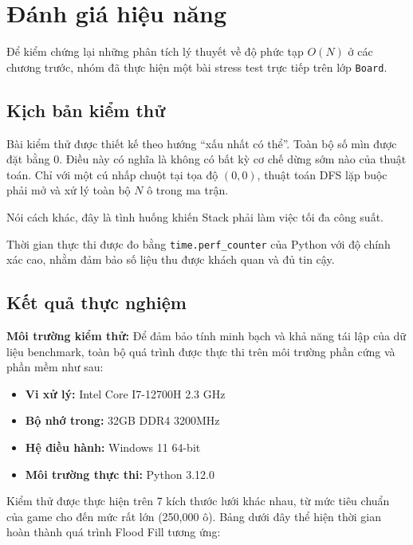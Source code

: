 \section{Đánh giá hiệu năng}

Để kiểm chứng lại những phân tích lý thuyết về độ phức tạp $O(N)$ ở các chương trước, nhóm đã thực hiện một bài stress test trực tiếp trên lớp \texttt{Board}.

\subsection{Kịch bản kiểm thử }

Bài kiểm thử được thiết kế theo hướng “xấu nhất có thể”. Toàn bộ số mìn được đặt bằng $0$. Điều này có nghĩa là không có bất kỳ cơ chế dừng sớm nào của thuật toán. Chỉ với một cú nhấp chuột tại tọa độ $(0,0)$, thuật toán DFS lặp buộc phải mở và xử lý toàn bộ $N$ ô trong ma trận.

Nói cách khác, đây là tình huống khiến Stack phải làm việc tối đa công suất.

Thời gian thực thi được đo bằng \texttt{time.perf\_counter} của Python với độ chính xác cao, nhằm đảm bảo số liệu thu được khách quan và đủ tin cậy.

\subsection{Kết quả thực nghiệm}

\textbf{Môi trường kiểm thử:}
Để đảm bảo tính minh bạch và khả năng tái lập của dữ liệu benchmark, toàn bộ quá trình được thực thi trên môi trường phần cứng và phần mềm như sau:
\begin{itemize}
    \item \textbf{Vi xử lý:} Intel Core I7-12700H 2.3 GHz
    \item \textbf{Bộ nhớ trong:} 32GB DDR4 3200MHz
    \item \textbf{Hệ điều hành:} Windows 11 64-bit
    \item \textbf{Môi trường thực thi:} Python 3.12.0
\end{itemize}

Kiểm thử được thực hiện trên 7 kích thước lưới khác nhau, từ mức tiêu chuẩn của game cho đến mức rất lớn (250,000 ô). Bảng dưới đây thể hiện thời gian hoàn thành quá trình Flood Fill tương ứng:

